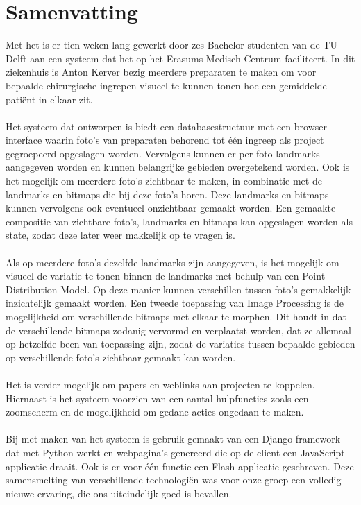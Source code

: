 \section{Samenvatting}

Met het \casamproject is er tien weken lang gewerkt door zes Bachelor studenten van de TU Delft aan een 
systeem dat het \casamproject op het Erasums Medisch Centrum faciliteert. 
In dit ziekenhuis is Anton Kerver bezig meerdere preparaten te maken om voor bepaalde chirurgische ingrepen visueel te kunnen tonen hoe een gemiddelde pati\"{e}nt in elkaar zit.
\\
\\
Het systeem dat ontworpen is biedt een databasestructuur met een browser-interface waarin foto's van 
preparaten behorend tot \'{e}\'{e}n ingreep als project gegroepeerd opgeslagen worden. 
Vervolgens kunnen er per foto landmarks aangegeven worden en kunnen belangrijke gebieden overgetekend worden.
Ook is het mogelijk om meerdere foto's zichtbaar te maken, in combinatie met de landmarks en bitmaps die bij deze foto's horen.
Deze landmarks en bitmaps kunnen vervolgens ook eventueel onzichtbaar gemaakt worden.
Een gemaakte compositie van zichtbare foto's, landmarks en bitmaps kan opgeslagen worden als state, zodat deze later weer makkelijk op te vragen is.
\\
\\
Als op meerdere foto's dezelfde landmarks zijn aangegeven, is het mogelijk om visueel de variatie te tonen binnen de landmarks met behulp van een Point Distribution Model. 
Op deze manier kunnen verschillen tussen foto's gemakkelijk inzichtelijk gemaakt worden.
Een tweede toepassing van Image Processing is de mogelijkheid om verschillende bitmaps met elkaar te morphen. 
Dit houdt in dat de verschillende bitmaps zodanig vervormd en verplaatst worden, dat ze allemaal op hetzelfde been van toepassing zijn, zodat de variaties tussen bepaalde gebieden op verschillende foto's zichtbaar 
gemaakt kan worden.
\\
\\
Het is verder mogelijk om papers en weblinks aan projecten te koppelen.
Hiernaast is het systeem voorzien van een aantal hulpfuncties zoals een zoomscherm en de mogelijkheid om 
gedane acties ongedaan te maken. 
\\
\\
Bij met maken van het systeem is gebruik gemaakt van een Django framework dat met Python werkt en webpagina's genereerd die op de client een JavaScript-applicatie draait. 
Ook is er voor \'{e}\'{e}n functie een Flash-applicatie geschreven.
Deze samensmelting van verschillende technologi\"{e}n was voor onze groep een volledig nieuwe ervaring, die 
ons uiteindelijk goed is bevallen.
